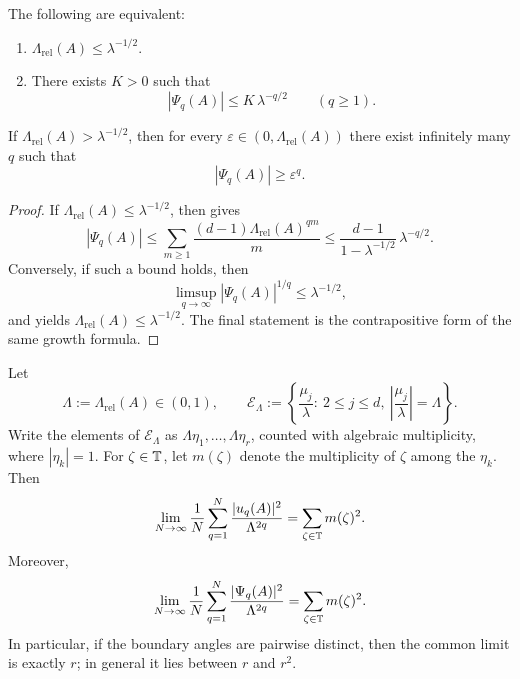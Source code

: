 \begin{corollary}
  \label{cor:finite-part-near-rh-q-axis-envelope}
  The following are equivalent:
  \begin{enumerate}[label=\textup{(\roman*)}]
    \item \(\Lambda_{\mathrm{rel}}(A)\le \lambda^{-1/2}\).
    \item There exists \(K>0\) such that
    \[
      |\Psi_q(A)|\le K\,\lambda^{-q/2}
      \qquad (q\ge 1).
    \]
  \end{enumerate}
  If \(\Lambda_{\mathrm{rel}}(A)>\lambda^{-1/2}\), then for every
  \(\varepsilon\in(0,\Lambda_{\mathrm{rel}}(A))\) there exist infinitely
  many \(q\) such that
  \[
    |\Psi_q(A)|\ge \varepsilon^q.
  \]
\end{corollary}

\begin{proof}
  If \(\Lambda_{\mathrm{rel}}(A)\le \lambda^{-1/2}\), then
   gives
  \[
    |\Psi_q(A)|
    \le \sum_{m\ge 1}\frac{(d-1)\Lambda_{\mathrm{rel}}(A)^{qm}}{m}
    \le \frac{d-1}{1-\lambda^{-1/2}}\,\lambda^{-q/2}.
  \]
  Conversely, if such a bound holds, then
  \[
    \limsup_{q\to\infty}|\Psi_q(A)|^{1/q}\le \lambda^{-1/2},
  \]
  and  yields
  \(\Lambda_{\mathrm{rel}}(A)\le \lambda^{-1/2}\). The final statement
  is the contrapositive form of the same growth formula.
\end{proof}

\begin{theorem}
  \label{thm:finite-part-boundary-multiplicity-qaxis-energy}
  Let
  \[
    \Lambda:=\Lambda_{\mathrm{rel}}(A)\in(0,1),
    \qquad
    \mathcal E_\Lambda
    :=\left\{\frac{\mu_j}{\lambda}:\ 2\le j\le d,\
      \left|\frac{\mu_j}{\lambda}\right|=\Lambda\right\}.
  \]
  Write the elements of \(\mathcal E_\Lambda\) as
  \(\Lambda\eta_1,\dots,\Lambda\eta_r\), counted with algebraic
  multiplicity, where \(|\eta_k|=1\). For \(\zeta\in\mathbb{T}\), let
  \(m(\zeta)\) denote the multiplicity of \(\zeta\) among the
  \(\eta_k\). Then
  \[
    \lim_{N\to\infty}\frac{1}{N}\sum_{q=1}^{N}
      \frac{|u_q(A)|^2}{\Lambda^{2q}}
    =\sum_{\zeta\in\mathbb{T}}m(\zeta)^2.
  \]
  Moreover,
  \[
    \lim_{N\to\infty}\frac{1}{N}\sum_{q=1}^{N}
      \frac{|\Psi_q(A)|^2}{\Lambda^{2q}}
    =\sum_{\zeta\in\mathbb{T}}m(\zeta)^2.
  \]
  In particular, if the boundary angles are pairwise distinct, then the
  common limit is exactly \(r\); in general it lies between \(r\) and
  \(r^2\).
\end{theorem}

